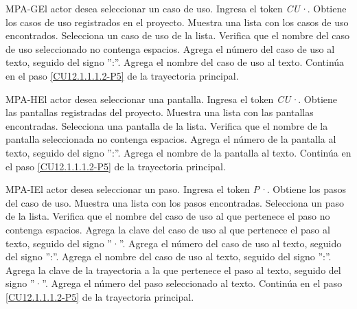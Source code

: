 	\begin{UCtrayectoriaA}{MPA-G}{El actor desea seleccionar un caso de uso.}
		\UCpaso[\UCactor] Ingresa el token {\em CU·}. 
		\UCpaso[\UCsist] Obtiene los casos de uso registrados en el proyecto.
		\UCpaso[\UCsist] Muestra una lista con los casos de uso encontrados.
		\UCpaso[\UCactor] Selecciona un caso de uso de la lista.
		\UCpaso[\UCsist] Verifica que el nombre del caso de uso seleccionado no contenga espacios. 
		\UCpaso[\UCsist] Agrega el número del caso de uso al texto, seguido del signo '':''.
		\UCpaso[\UCsist] Agrega el nombre del caso de uso al texto.
		\UCpaso Continúa en el paso \ref{CU12.1.1.1.2-P5} de la trayectoria principal.
	\end{UCtrayectoriaA}

	\begin{UCtrayectoriaA}{MPA-H}{El actor desea seleccionar una pantalla.}
		\UCpaso[\UCactor] Ingresa el token {\em CU·}. 
		\UCpaso[\UCsist] Obtiene las pantallas registradas del proyecto.
		\UCpaso[\UCsist] Muestra una lista con las pantallas encontradas.
		\UCpaso[\UCactor] Selecciona una pantalla de la lista.
		\UCpaso[\UCsist] Verifica que el nombre de la pantalla seleccionada no contenga espacios. 
		\UCpaso[\UCsist] Agrega el número de la pantalla al texto, seguido del signo '':''.
		\UCpaso[\UCsist] Agrega el nombre de la pantalla al texto.
		\UCpaso Continúa en el paso \ref{CU12.1.1.1.2-P5} de la trayectoria principal.
	\end{UCtrayectoriaA}

	\begin{UCtrayectoriaA}{MPA-I}{El actor desea seleccionar un paso.}
		\UCpaso[\UCactor] Ingresa el token {\em P·}. 
		\UCpaso[\UCsist] Obtiene los pasos del caso de uso.
		\UCpaso[\UCsist] Muestra una lista con los pasos encontradas.
		\UCpaso[\UCactor] Selecciona un paso de la lista.
		\UCpaso[\UCsist] Verifica que el nombre del caso de uso al que pertenece el paso no contenga espacios. 
		\UCpaso[\UCsist] Agrega la clave del caso de uso al que pertenece el paso al texto, seguido del signo ''·''.
		\UCpaso[\UCsist] Agrega el número del caso de uso al texto, seguido del signo '':''.
		\UCpaso[\UCsist] Agrega el nombre del caso de uso al texto, seguido del signo '':''.
		\UCpaso[\UCsist] Agrega la clave de la trayectoria a la que pertenece el paso al texto, seguido del signo ''·''.
		\UCpaso[\UCsist] Agrega el número del paso seleccionado al texto.
		\UCpaso Continúa en el paso \ref{CU12.1.1.1.2-P5} de la trayectoria principal.
	\end{UCtrayectoriaA}

